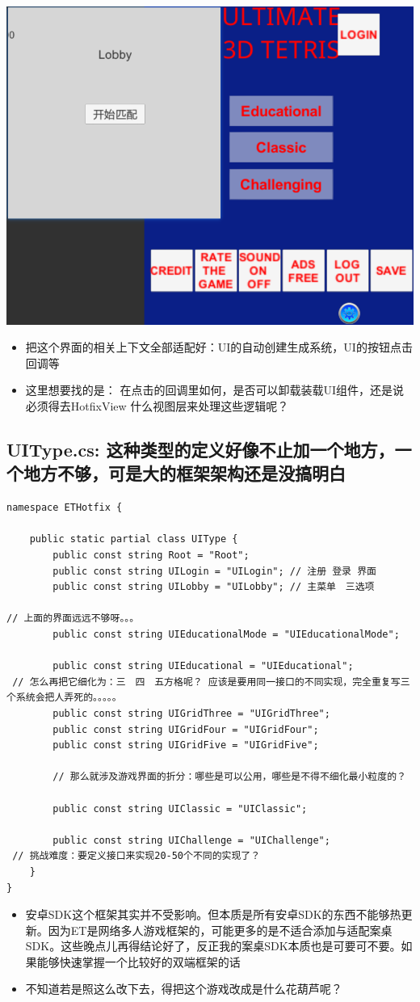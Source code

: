\documentclass[9pt, b5paper]{article}
\begin{document}
\includegraphics[width=.9\linewidth]{./pic/readme_20230201_202642.png}
\begin{itemize}
\item 把这个界面的相关上下文全部适配好：UI的自动创建生成系统，UI的按钮点击回调等
\item 这里想要找的是： 在点击的回调里如何，是否可以卸载装载UI组件，还是说必须得去HotfixView 什么视图层来处理这些逻辑呢？
\end{itemize}
\subsection{UIType.cs: 这种类型的定义好像不止加一个地方，一个地方不够，可是大的框架架构还是没搞明白}
\label{sec-4-1}
\begin{verbatim}
namespace ETHotfix {

    public static partial class UIType {
        public const string Root = "Root";
        public const string UILogin = "UILogin"; // 注册 登录 界面
        public const string UILobby = "UILobby"; // 主菜单　三选项

// 上面的界面远远不够呀。。。
        public const string UIEducationalMode = "UIEducationalMode"; 

        public const string UIEducational = "UIEducational"; 
 // 怎么再把它细化为：三　四　五方格呢？ 应该是要用同一接口的不同实现，完全重复写三个系统会把人弄死的。。。。。
        public const string UIGridThree = "UIGridThree";
        public const string UIGridFour = "UIGridFour"; 
        public const string UIGridFive = "UIGridFive"; 

        // 那么就涉及游戏界面的折分：哪些是可以公用，哪些是不得不细化最小粒度的？
        
        public const string UIClassic = "UIClassic"; 

        public const string UIChallenge = "UIChallenge"; 
 // 挑战难度：要定义接口来实现20-50个不同的实现了？        
    }
}
\end{verbatim}

\begin{itemize}
\item 安卓SDK这个框架其实并不受影响。但本质是所有安卓SDK的东西不能够热更新。因为ET是网络多人游戏框架的，可能更多的是不适合添加与适配案桌SDK。这些晚点儿再得结论好了，反正我的案桌SDK本质也是可要可不要。如果能够快速掌握一个比较好的双端框架的话
\item 不知道若是照这么改下去，得把这个游戏改成是什么花葫芦呢？
\end{itemize}
\end{document}
